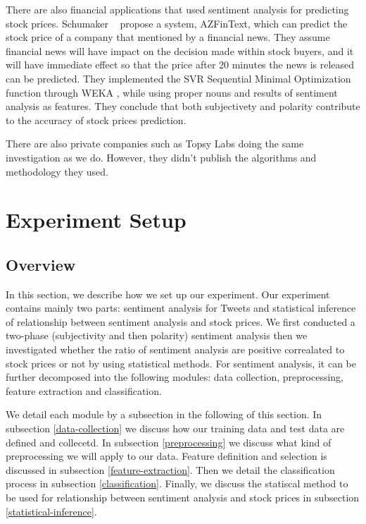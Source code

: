 \documentclass[12pt]{article}
\begin{document}
There are also financial applications that used sentiment analysis for predicting stock prices. Schumaker \etal~\cite{Schumaker:2009} propose a system, AZFinText, which can predict the stock price of a company that mentioned by a financial news. They assume financial news will have impact on the decision made within stock buyers, and it will have immediate effect so that the price after 20 minutes the news is released can be predicted. They implemented the SVR Sequential Minimal Optimization function through WEKA \cite{Witten:2005}, while using proper nouns and results of sentiment analysis as features. They conclude that both subjectivety and polarity contribute to the accuracy of stock prices prediction.

There are also private companies such as Topsy Labs \cite{Topsy} doing the same investigation as we do. However, they didn't publish the algorithms and methodology they used.

\section{Experiment Setup}
\subsection{Overview}
In this section, we describe how we set up our experiment. Our experiment contains mainly two parts: sentiment analysis for Tweets and statistical inference of relationship between sentiment analysis and stock prices. We first conducted a two-phase (subjectivity and then polarity) sentiment analysis then we investigated whether the ratio of sentiment analysis are positive correalated to stock prices or not by using statistical methods. For sentiment analysis, it can be further decomposed into the following modules: data collection, preprocessing, feature extraction and classification. 

We detail each module by a subsection in the following of this section. In subsection \ref{data-collection} we discuss how our training data and test data are defined and collecetd. In subsection \ref{preprocessing} we discuss what kind of preprocessing we will apply to our data. Feature definition and selection is discussed in subsection \ref{feature-extraction}. Then we detail the classification process in subsection \ref{classification}. Finally, we discuss the statiscal method to be used for relationship between sentiment analysis and stock prices in subsection \ref{statistical-inference}.
\end{document}
